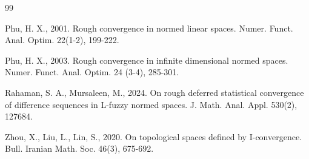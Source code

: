 \documentclass[11pt]{amsart}
\begin{document}
\begin{thebibliography}{99}
	
	 Phu, H. X., 2001. Rough convergence in normed linear spaces. Numer. Funct. Anal. Optim. 22(1-2), 199-222.
	
	 Phu, H. X., 2003. Rough convergence in infinite dimensional normed spaces. Numer. Funct. Anal. Optim. 24 (3-4), 285-301.

     Rahaman, S. A.,  Mursaleen, M., 2024. On rough deferred statistical convergence of difference sequences in L-fuzzy normed spaces. J. Math. Anal. Appl. 530(2), 127684.


	 Zhou, X., Liu, L., Lin, S., 2020. On topological spaces defined by I-convergence. Bull. Iranian Math. Soc. 46(3), 675-692.
\end{thebibliography}
\end{document}

